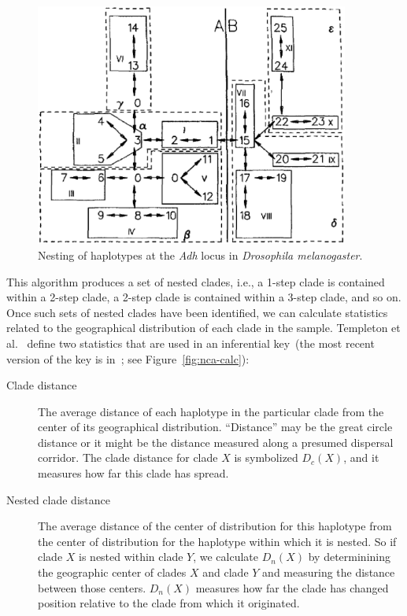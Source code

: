 \documentclass[12pt]{article}
\begin{document}
\begin{figure}
\begin{center}
\includegraphics[height=8cm]{nca-nesting.eps}
\end{center}
\caption{Nesting of haplotypes at the {\it Adh\/} locus in {\it
    Drosophila melanogaster}.}\label{fig:nca-nesting}
\end{figure}

This algorithm produces a set of nested clades, i.e., a 1-step clade
is contained within a 2-step clade, a 2-step clade is contained within
a 3-step clade, and so on. Once such sets of nested clades have been
identified, we can calculate statistics related to the geographical
distribution of each clade in the sample. Templeton et
al.~\cite{Templeton-etal-1995} define two statistics that are used in
an inferential key~(the most recent version of the key is
in~\cite{Templeton-2004}; see Figure~\ref{fig:nca-calc}):

\begin{description}

\item[Clade distance] The average distance of each haplotype in the
  particular clade from the center of its geographical
  distribution. ``Distance'' may be the great circle distance or it
  might be the distance measured along a presumed dispersal
  corridor. The clade distance for clade $X$ is symbolized $D_c(X)$,
  and it measures how far this clade has spread.

\item[Nested clade distance] The average distance of the center of
  distribution for this haplotype from the center of distribution for
  the haplotype within which it is nested. So if clade $X$ is nested
  within clade $Y$, we calculate $D_n(X)$ by determinining the
  geographic center of clades $X$ and clade $Y$ and measuring the
  distance between those centers. $D_n(X)$ measures how far the clade
  has changed position relative to the clade from which it
  originated.

\end{description}
\end{document}
